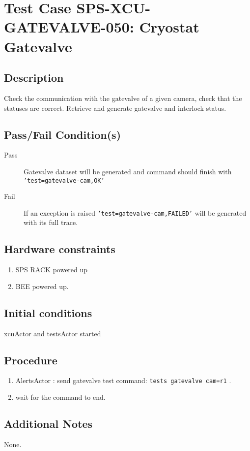 \section{Test Case SPS-XCU-GATEVALVE-050: Cryostat Gatevalve}

\subsection{Description}

Check the communication with the gatevalve of a given camera, check that the statuses are correct.
Retrieve and generate gatevalve and interlock status.

\subsection{Pass/Fail Condition(s)}

\begin{description}
\item [Pass] Gatevalve dataset will be generated and command should finish with \texttt{'test=gatevalve-cam,OK'}
\item [Fail] If an exception is raised \texttt{'test=gatevalve-cam,FAILED'} will be generated with its full trace.

\end{description}

\subsection{Hardware constraints}

\begin{enumerate}
    \item SPS RACK powered up
    \item BEE powered up.
\end{enumerate}

\subsection{Initial conditions}

xcuActor and testsActor started

\subsection{Procedure}

\begin{enumerate}
    \item AlertsActor : send gatevalve test command: \texttt{tests gatevalve cam=r1} .
    \item wait for the command to end.
\end{enumerate}

\subsection{Additional Notes}
None.
